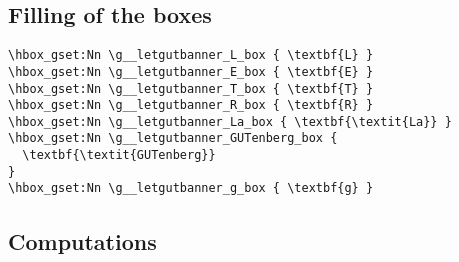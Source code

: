 \documentclass{letgut}
\begin{document}
\subsection{Filling of the boxes}
\label{sec:orgdd18dd8}
\begin{lstlisting}
\hbox_gset:Nn \g__letgutbanner_L_box { \textbf{L} }
\hbox_gset:Nn \g__letgutbanner_E_box { \textbf{E} }
\hbox_gset:Nn \g__letgutbanner_T_box { \textbf{T} }
\hbox_gset:Nn \g__letgutbanner_R_box { \textbf{R} }
\hbox_gset:Nn \g__letgutbanner_La_box { \textbf{\textit{La}} }
\hbox_gset:Nn \g__letgutbanner_GUTenberg_box {
  \textbf{\textit{GUTenberg}}
}
\hbox_gset:Nn \g__letgutbanner_g_box { \textbf{g} }
\end{lstlisting}

\subsection{Computations}
\label{sec:orgb1ea800}
\end{document}
